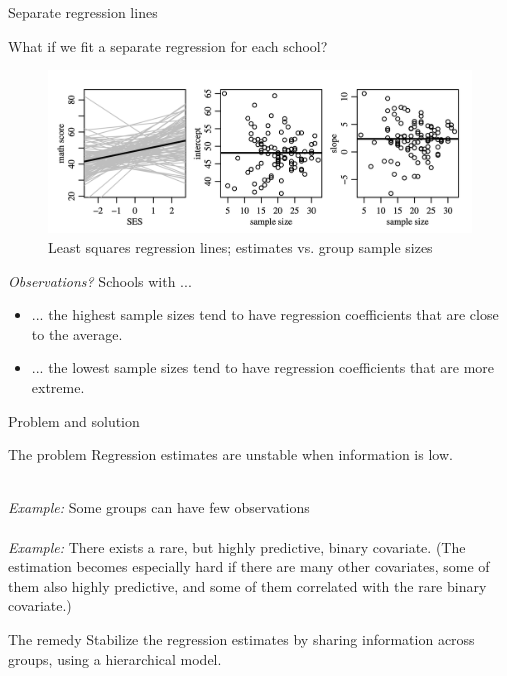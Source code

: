 \documentclass[10pt]{beamer}
\begin{document}
\begin{frame}{Separate regression lines}

\scriptsize 	
What if we fit a separate regression for each school?

\begin{figure}
\begin{center}
\includegraphics[width=\textwidth]{images/hoff_hierarchical_linreg}
\caption{Least squares regression lines;  estimates vs. group sample sizes} 
\end{center}
\end{figure}

\textit{Observations?} \pause Schools with ...
\begin{itemize}
\item ... the highest sample sizes tend to have regression coefficients that are close to the average.
\item ... the lowest sample sizes tend to have regression coefficients that are more extreme.
\end{itemize}

\vfill 

\end{frame}


\begin{frame}{Problem and solution}

\begin{block}{The problem}
Regression estimates are unstable when information is low.

{ }  \\
\textit{Example:} Some groups can have few observations \\

{ } \\
\textit{Example:} \pause  There exists a rare, but highly predictive, binary covariate. 	{\tiny (The estimation becomes especially hard if there are many other covariates, some of them also highly predictive, and some of them correlated with the rare binary covariate.)}
\end{block}
	
\begin{block}{The remedy}
Stabilize the regression estimates by sharing information across groups, using a hierarchical model.
\end{block}

\end{frame}
\end{document}
